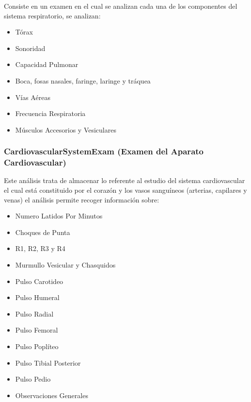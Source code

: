 Consiste en un examen en el cual se analizan cada una de los componentes del sistema respiratorio, se analizan:

\begin{itemize}
    \item Tórax
    \item Sonoridad
    \item Capacidad Pulmonar
    \item Boca, fosas nasales, faringe, laringe y tráquea 
    \item Vías Aéreas
    \item Frecuencia Respiratoria
    \item Músculos Accesorios y Vesiculares
\end{itemize}

\subsubsection{CardiovascularSystemExam (Examen del Aparato Cardiovascular)}

Este análisis trata de almacenar lo referente al estudio del sistema cardiovascular el cual está constituido por el corazón y los vasos sanguíneos (arterias, capilares y venas) el análisis permite recoger información sobre:

\begin{itemize}
    \item Numero Latidos Por Minutos 
    \item Choques de Punta
    \item R1, R2, R3 y R4
    \item Murmullo Vesicular y Chasquidos
    \item Pulso Carotideo
    \item Pulso Humeral
    \item Pulso Radial
    \item Pulso Femoral
    \item Pulso Poplíteo
    \item Pulso Tibial Posterior
    \item Pulso Pedio
    \item Observaciones Generales
\end{itemize}



